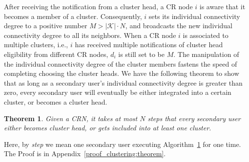 \documentclass[10pt,journal,compsoc]{IEEEtran}
\makeatletter
\theoremstyle{mytheoremstyle}
\newtheorem{theorem}{Theorem}[section]
\theoremstyle{mytheoremstyle}
\theoremstyle{mytheoremstyle}
\renewenvironment{proof}[1][\proofname]{%
      \par\pushQED{\qed}\fontfamily{ptm}\selectfont%
      \topsep6\p@\@plus6\p@\relax
      \trivlist\item[\hskip\labelsep\bfseries#1\@addpunct{.}]%
      \ignorespaces
    }{%
      \popQED\endtrivlist\@endpefalse
    }
\newcommand{\ie}{i.e., }
\makeatother
\begin{document}
After receiving the notification from a cluster head, a CR node $i$ is aware that it becomes a member of a cluster. 
Consequently, $i$ sets its individual connectivity degree to a positive number $M > |\mathcal{K}| \cdot N$, and broadcasts the new individual connectivity degree to all its neighbors. 
When a CR node $i$ is associated to multiple clusters, \ie $i$ has received multiple notifications of cluster head eligibility from different CR nodes, $d_i$ is still set to be $M$. 
The manipulation of the individual connectivity degree of the cluster members fastens the speed of completing choosing the cluster heads.
We have the following theorem to show that as long as a secondary user's individual connectivity degree is greater than zero, every secondary user will eventually be either integrated into a certain cluster, or becomes a cluster head.
\begin{theorem}
\label{clustering:theorem}
Given a CRN, it takes at most $N$ steps that every secondary user either becomes cluster head, or gets included into at least one cluster.
\end{theorem}
Here, by \textit{step} we mean one secondary user executing Algorithm~\ref{clustering:theorem} for one time.
The Proof is in Appendix~\ref{proof_clustering:theorem}.
\end{document}
